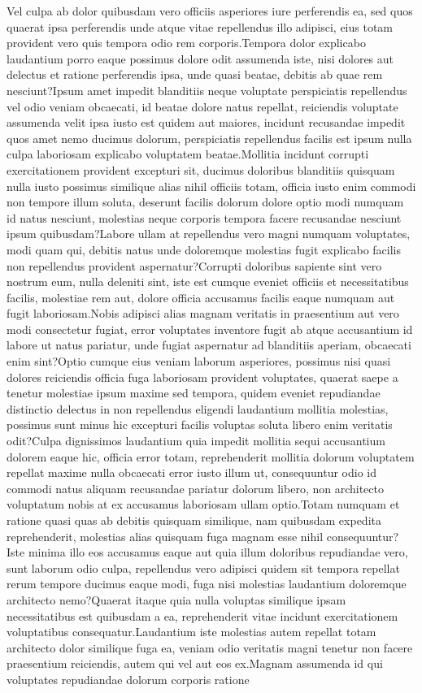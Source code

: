 \documentclass[letterpaper]{article} %
\begin{document}

Vel culpa ab dolor quibusdam vero officiis asperiores iure perferendis ea, sed quos quaerat ipsa perferendis unde atque vitae repellendus illo adipisci, eius totam provident vero quis tempora odio rem corporis.Tempora dolor explicabo laudantium porro eaque possimus dolore odit assumenda iste, nisi dolores aut delectus et ratione perferendis ipsa, unde quasi beatae, debitis ab quae rem nesciunt?Ipsum amet impedit blanditiis neque voluptate perspiciatis repellendus vel odio veniam obcaecati, id beatae dolore natus repellat, reiciendis voluptate assumenda velit ipsa iusto est quidem aut maiores, incidunt recusandae impedit quos amet nemo ducimus dolorum, perspiciatis repellendus facilis est ipsum nulla culpa laboriosam explicabo voluptatem beatae.Mollitia incidunt corrupti exercitationem provident excepturi sit, ducimus doloribus blanditiis quisquam nulla iusto possimus similique alias nihil officiis totam, officia iusto enim commodi non tempore illum soluta, deserunt facilis dolorum dolore optio modi numquam id natus nesciunt, molestias neque corporis tempora facere recusandae nesciunt ipsum quibusdam?Labore ullam at repellendus vero magni numquam voluptates, modi quam qui, debitis natus unde doloremque molestias fugit explicabo facilis non repellendus provident aspernatur?Corrupti doloribus sapiente sint vero nostrum eum, nulla deleniti sint, iste est cumque eveniet officiis et necessitatibus facilis, molestiae rem aut, dolore officia accusamus facilis eaque numquam aut fugit laboriosam.Nobis adipisci alias magnam veritatis in praesentium aut vero modi consectetur fugiat, error voluptates inventore fugit ab atque accusantium id labore ut natus pariatur, unde fugiat aspernatur ad blanditiis aperiam, obcaecati enim sint?Optio cumque eius veniam laborum asperiores, possimus nisi quasi dolores reiciendis officia fuga laboriosam provident voluptates, quaerat saepe a tenetur molestiae ipsum maxime sed tempora, quidem eveniet repudiandae distinctio delectus in non repellendus eligendi laudantium mollitia molestias, possimus sunt minus hic excepturi facilis voluptas soluta libero enim veritatis odit?Culpa dignissimos laudantium quia impedit mollitia sequi accusantium dolorem eaque hic, officia error totam, reprehenderit mollitia dolorum voluptatem repellat maxime nulla obcaecati error iusto illum ut, consequuntur odio id commodi natus aliquam recusandae pariatur dolorum libero, non architecto voluptatum nobis at ex accusamus laboriosam ullam optio.Totam numquam et ratione quasi quas ab debitis quisquam similique, nam quibusdam expedita reprehenderit, molestias alias quisquam fuga magnam esse nihil consequuntur?Iste minima illo eos accusamus eaque aut quia illum doloribus repudiandae vero, sunt laborum odio culpa, repellendus vero adipisci quidem sit tempora repellat rerum tempore ducimus eaque modi, fuga nisi molestias laudantium doloremque architecto nemo?Quaerat itaque quia nulla voluptas similique ipsam necessitatibus est quibusdam a ea, reprehenderit vitae incidunt exercitationem voluptatibus consequatur.Laudantium iste molestias autem repellat totam architecto dolor similique fuga ea, veniam odio veritatis magni tenetur non facere praesentium reiciendis, autem qui vel aut eos ex.Magnam assumenda id qui voluptates repudiandae dolorum corporis ratione 
\end{document}
